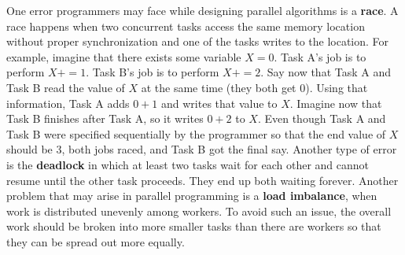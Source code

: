 \documentclass{article}
\begin{document}
    One error programmers may face while designing parallel algorithms is a \textbf{race}. A race happens when two concurrent tasks access the same memory location without proper synchronization and one of the tasks writes to the location. For example, imagine that there exists some variable $X=0$. Task A's job is to perform $X+=1$. Task B's job is to perform $X+=2$. Say now that Task A and Task B read the value of $X$ at the same time (they both get 0). Using that information, Task A adds $0+1$ and writes that value to $X$. Imagine now that Task B finishes after Task A, so it writes $0+2$ to $X$. Even though Task A and Task B were specified sequentially by the programmer so that the end value of $X$ should be 3, both jobs raced, and Task B got the final say. Another type of error is the \textbf{deadlock} in which at least two tasks wait for each other and cannot resume until the other task proceeds. They end up both waiting forever. Another problem that may arise in parallel programming is a \textbf{load imbalance}, when work is distributed unevenly among workers. To avoid such an issue, the overall work should be broken into more smaller tasks than there are workers so that they can be spread out more equally. 

    
\end{document}
